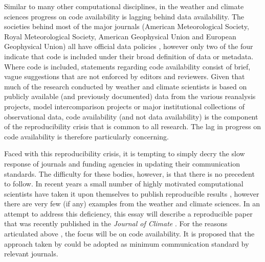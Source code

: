 Similar to many other computational disciplines, in the weather and climate sciences progress on code availability is lagging behind data availability. The societies behind most of the major journals (American Meteorological Society, Royal Meteorological Society, American Geophysical Union and European Geophysical Union) all have official data policies \citep[e.g.][]{Mayernik2015}, however only two of the four indicate that code is included under their broad definition of data or metadata. Where code is included, statements regarding code availability consist of brief, vague suggestions that are not enforced by editors and reviewers. Given that much of the research conducted by weather and climate scientists is based on publicly available (and previously documented) data from the various reanalysis projects, model intercomparison projects or major institutional collections of observational data, code availability (and not data availability) is the component of the reproducibility crisis that is common to all research. The lag in progress on code availability is therefore particularly concerning. 

Faced with this reproducibility crisis, it is tempting to simply decry the slow response of journals and funding agencies in updating their communication standards. The difficulty for these bodies, however, is that there is no precedent to follow. In recent years a small number of highly motivated computational scientists have taken it upon themselves to publish reproducible results \citep[e.g.][]{Crooks2014,Ketcheson2012,Schmitt2015}, however there are very few (if any) examples from the weather and climate sciences. In an attempt to address this deficiency, this essay will describe a reproducible paper that was recently published in the \textit{Journal of Climate} \citep{Irving2016}. For the reasons articulated above \citep[and the fact that data availability was already addressed in a recent BAMS essay;][]{Mayernik2015a}, the focus will be on code availability. It is proposed that the approach taken by \citet{Irving2016} could be adopted as minimum communication standard by relevant journals.  

  
  
  
  